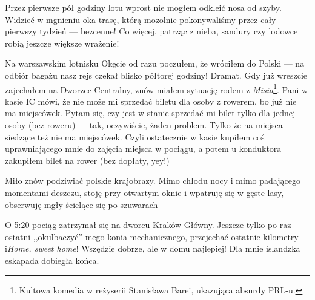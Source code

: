 
Przez pierwsze pół godziny lotu wprost nie mogłem odkleić nosa od szyby. Widzieć w mgnieniu oka trasę, którą mozolnie pokonywaliśmy przez cały pierwszy tydzień --- bezcenne! Co więcej, patrząc z nieba, sandury czy lodowce robią jeszcze większe wrażenie!

Na warszawskim lotnisku Okęcie od razu poczułem, że wróciłem do Polski --- na odbiór bagażu nasz rejs czekał blisko półtorej godziny! Dramat. Gdy już wreszcie zajechałem na Dworzec Centralny, znów miałem sytuację rodem z \emph{Misia}\footnote{Kultowa komedia w reżyserii Stanisława Barei, ukazująca absurdy PRL-u.}. Pani w kasie IC mówi, że nie może mi sprzedać biletu dla osoby z rowerem, bo już nie ma miejscówek. Pytam się, czy jest w stanie sprzedać mi bilet tylko dla jednej osoby (bez roweru) --- tak, oczywiście, żaden problem. Tylko że na miejsca siedzące też nie ma miejscówek. Czyli ostatecznie w kasie kupiłem coś uprawniającego mnie do zajęcia miejsca w pociągu, a potem u konduktora zakupiłem bilet na rower (bez dopłaty, yey!)

Miło znów podziwiać polskie krajobrazy. Mimo chłodu nocy i mimo padającego momentami deszczu, stoję przy otwartym oknie i wpatruję się w gęste lasy, obserwuję mgły ścielące się po szuwarach\textellipsis

O 5:20 pociąg zatrzymał się na dworcu Kraków Główny. Jeszcze tylko po raz ostatni ,,okulbaczyć'' mego konia mechanicznego, przejechać ostatnie kilometry i\textellipsis \emph{Home, sweet home}! Wszędzie dobrze, ale w domu najlepiej! Dla mnie islandzka eskapada dobiegła końca.

